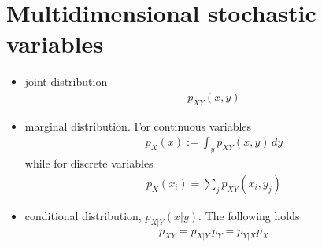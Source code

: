 \documentclass[letterpaper,10pt,english]{jupyterBook}
\begin{document}
\section{Multi\sphinxhyphen{}dimensional stochastic variables}
\label{\detokenize{ch/prob/rv-multi-dimensional:multi-dimensional-stochastic-variables}}\label{\detokenize{ch/prob/rv-multi-dimensional:prob-multidim}}\label{\detokenize{ch/prob/rv-multi-dimensional::doc}}\begin{itemize}
\item {} 
\sphinxAtStartPar
joint distribution
\begin{equation*}
\begin{split}p_{XY}(x,y) \end{split}
\end{equation*}
\item {} 
\sphinxAtStartPar
marginal distribution. For continuous variables
\begin{equation*}
\begin{split}p_X(x) := \int_{y} p_{XY}(x,y) \, dy\end{split}
\end{equation*}
\sphinxAtStartPar
while for discrete variables
\begin{equation*}
\begin{split}p_X(x_i) = \sum_j p_{XY}(x_i,y_j)\end{split}
\end{equation*}
\item {} 
\sphinxAtStartPar
conditional distribution, \(p_{X|Y}(x|y)\). The following holds
\begin{equation*}
\begin{split}p_{XY} = p_{X|Y} \, p_Y = p_{Y|X} p_X\end{split}
\end{equation*}
\end{itemize}
\end{document}
